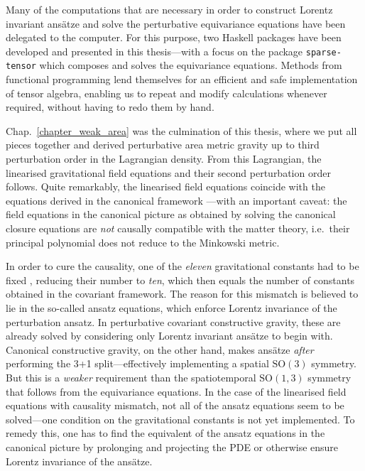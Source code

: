 Many of the computations that are necessary in order to construct Lorentz invariant ansätze and solve the perturbative equivariance equations have been delegated to the computer. For this purpose, two Haskell packages have been developed and presented in this thesis---with a focus on the package \texttt{sparse-tensor} which composes and solves the equivariance equations. Methods from functional programming lend themselves for an efficient and safe implementation of tensor algebra, enabling us to repeat and modify calculations whenever required, without having to redo them by hand.

Chap.~\ref{chapter_weak_area} was the culmination of this thesis, where we put all pieces together and derived perturbative area metric gravity up to third perturbation order in the Lagrangian density. From this Lagrangian, the linearised gravitational field equations and their second perturbation order follows. Quite remarkably, the linearised field equations coincide with the equations derived in the canonical framework \cite{Schneider_2017,Alex_2019}---with an important caveat: the field equations in the canonical picture as obtained by solving the canonical closure equations \cite{D_ll_2018,Schneider_2017} are \emph{not} causally compatible with the matter theory, i.e.\ their principal polynomial does not reduce to the Minkowski metric.

In order to cure the causality, one of the \emph{eleven} gravitational constants had to be fixed \cite{Alex_2019}, reducing their number to \emph{ten}, which then equals the number of constants obtained in the covariant framework. The reason for this mismatch is believed to lie in the so-called ansatz equations, which enforce Lorentz invariance of the perturbation ansatz. In perturbative covariant constructive gravity, these are already solved by considering only Lorentz invariant ansätze to begin with. Canonical constructive gravity, on the other hand, makes ansätze \emph{after} performing the 3+1 split---effectively implementing a spatial $\mathrm{SO}(3)$ symmetry. But this is a \emph{weaker} requirement than the spatiotemporal $\mathrm{SO}(1,3)$ symmetry that follows from the equivariance equations. In the case of the linearised field equations with causality mismatch, not all of the ansatz equations seem to be solved---one condition on the gravitational constants is not yet implemented. To remedy this, one has to find the equivalent of the ansatz equations in the canonical picture by prolonging and projecting the PDE or otherwise ensure Lorentz invariance of the ansätze.

